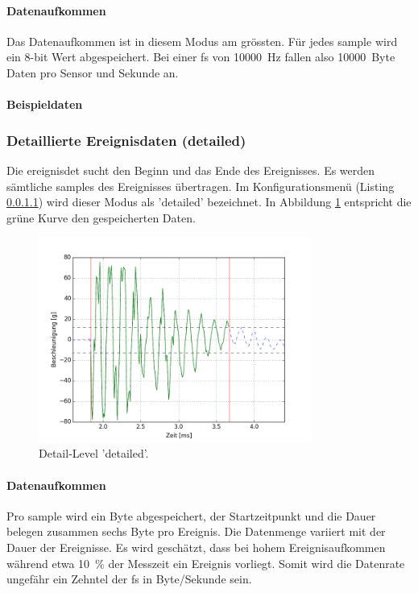 \paragraph{Datenaufkommen} Das Datenaufkommen ist in diesem Modus am grössten. Für jedes \gls{sample} wird ein 8-bit Wert abgespeichert. Bei einer \gls{fs} von 10000~Hz fallen also 10000~Byte Daten pro Sensor und Sekunde an.

\paragraph{Beispieldaten} 

\subsubsection{Detaillierte Ereignisdaten (detailed)}
Die \gls{ereignisdet} sucht den Beginn und das Ende des Ereignisses. Es werden sämtliche \glspl{sample} des Ereignisses übertragen. Im Konfigurationsmenü (Listing \ref{}) wird dieser Modus als 'detailed' bezeichnet. In Abbildung \ref{fig.detaildetailed} entspricht die grüne Kurve den gespeicherten Daten.

\begin{figure}
	\centering
		\includegraphics[width=0.8\textwidth]{images/detailed.png}
	\caption{Detail-Level 'detailed'.}
	\label{fig.detaildetailed}
\end{figure}

\paragraph{Datenaufkommen} Pro \gls{sample} wird ein Byte abgespeichert, der Startzeitpunkt und die Dauer belegen zusammen sechs Byte pro Ereignis. Die Datenmenge variiert mit der Dauer der Ereignisse. Es wird geschätzt, dass bei hohem Ereignisaufkommen während etwa 10~\% der Messzeit ein Ereignis vorliegt. Somit wird die Datenrate ungefähr ein Zehntel der \gls{fs} in Byte/Sekunde sein.

